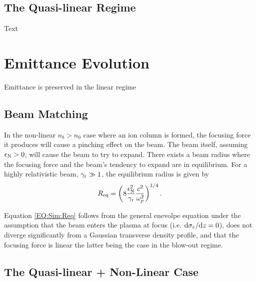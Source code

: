 \subsection{The Quasi-linear Regime}
\label{Sim:QLin}

Text


\section{Emittance Evolution}
\label{Sim:Emitt}

Emittance is preserved in the linear regime


\subsection{Beam Matching}
\label{Sim:Match}

In the non-linear $n_{b} > n_{0}$ case where an ion column is formed, the focusing force it produces will cause a pinching effect on the beam. The beam itself, assuming $\epsilon_{\mathrm{N}} > 0$, will cause the beam to try to expand. There exists a beam radius where the focusing force and the beam's tendency to expand are in equilibrium. For a highly relativistic beam, $\gamma_{\mathrm{r}} \gg 1$, the equilibrium radius is given by \cite{krall:1995}
\begin{equation}
    R_{\mathrm{eq}} = \left( 8 \frac{\epsilon_{\mathrm{N}}^2}{\gamma_{\mathrm{r}}} \frac{c^2}{\omega_{p}^2} \right)^{1/4}. \label{EQ:Sim:Req}
\end{equation}

Equation \ref{EQ:Sim:Req} follows from the general enevolpe equation \cite{lee:1976} under the assumption that the beam enters the plasma at focus (i.e. $\mathrm{d}\sigma_{r}/\mathrm{d}z = 0$), does not diverge significantly from a Gaussian transverse density profile, and that the focusing force is linear \cite{krall:1995} \dash the latter being the case in the blow-out regime.


\subsection{The Quasi-linear + Non-Linear Case}
\label{Sim:QLinNonLin}

